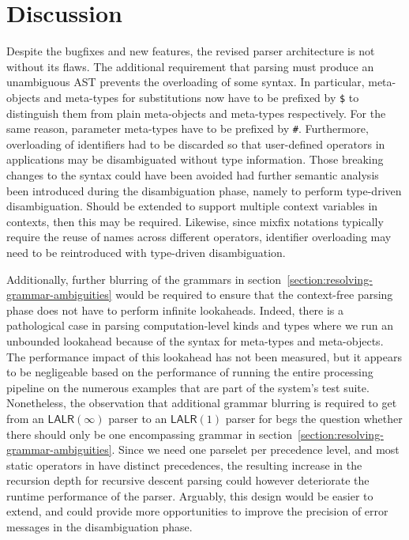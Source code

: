 \section{Discussion}

Despite the bugfixes and new features, the revised parser architecture is not without its flaws.
The additional requirement that parsing must produce an unambiguous \ac{AST} prevents the overloading of some syntax.
In particular, meta-objects and meta-types for substitutions now have to be prefixed by \texttt{\$} to distinguish them from plain meta-objects and meta-types respectively.
For the same reason, parameter meta-types have to be prefixed by \texttt{\#}.
Furthermore, overloading of identifiers had to be discarded so that user-defined operators in applications may be disambiguated without type information.
Those breaking changes to the syntax could have been avoided had further semantic analysis been introduced during the disambiguation phase, namely to perform type-driven disambiguation.
Should \Beluga be extended to support multiple context variables in contexts, then this may be required.
Likewise, since mixfix notations typically require the reuse of names across different operators, identifier overloading may need to be reintroduced with type-driven disambiguation.

Additionally, further blurring of the grammars in section~\ref{section:resolving-grammar-ambiguities} would be required to ensure that the context-free parsing phase does not have to perform infinite lookaheads.
Indeed, there is a pathological case in parsing computation-level kinds and types where we run an unbounded lookahead because of the syntax for meta-types and meta-objects.
The performance impact of this lookahead has not been measured, but it appears to be negligeable based on the performance of running the entire processing pipeline on the numerous examples that are part of the system's test suite.
Nonetheless, the observation that additional grammar blurring is required to get from an $ \mathsf{LALR}(\infty) $ parser to an $ \mathsf{LALR}(1) $ parser for \Beluga begs the question whether there should only be one encompassing grammar in section~\ref{section:resolving-grammar-ambiguities}.
Since we need one parselet per precedence level, and most static operators in \Beluga have distinct precedences, the resulting increase in the recursion depth for recursive descent parsing could however deteriorate the runtime performance of the parser.
Arguably, this design would be easier to extend, and could provide more opportunities to improve the precision of error messages in the disambiguation phase.

